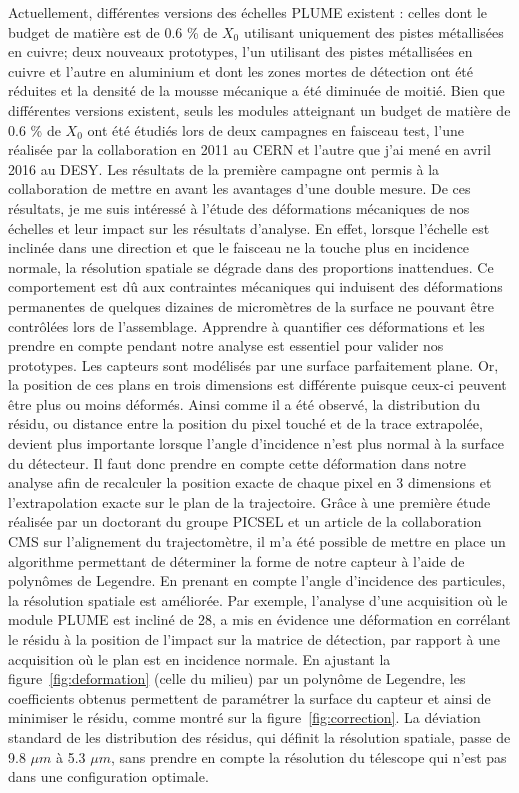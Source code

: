 \documentclass[a4papper, 10pt]{article}
\begin{document}
  Actuellement, différentes versions des échelles PLUME existent : celles dont le budget de matière est de 0.6 \% de $X_0$ utilisant uniquement des pistes métallisées en cuivre; deux nouveaux prototypes, l'un utilisant des pistes métallisées en cuivre et l'autre en aluminium et dont les zones mortes de détection ont été réduites et la densité de la mousse mécanique a été diminuée de moitié.
  Bien que différentes versions existent, seuls les modules atteignant un budget de matière de 0.6 \% de $X_0$ ont été étudiés lors de deux campagnes en faisceau test, l'une réalisée par la collaboration en 2011 au CERN et l'autre que j'ai mené en avril 2016 au DESY.
  Les résultats de la première campagne ont permis à la collaboration de mettre en avant les avantages d'une double mesure. 
  De ces résultats, je me suis intéressé à l'étude des déformations mécaniques de nos échelles et leur impact sur les résultats d'analyse.
  En effet, lorsque l'échelle est inclinée dans une direction et que le faisceau ne la touche plus en incidence normale, la résolution spatiale se dégrade dans des proportions inattendues.
  Ce comportement est dû aux contraintes mécaniques qui induisent des déformations permanentes de quelques dizaines de micromètres de la surface ne pouvant être contrôlées lors de l'assemblage.
  Apprendre à quantifier ces déformations et les prendre en compte pendant notre analyse est essentiel pour valider nos prototypes.
  Les capteurs sont modélisés par une surface parfaitement plane.
  Or, la position de ces plans en trois dimensions est différente puisque ceux-ci peuvent être plus ou moins déformés.
  Ainsi comme il a été observé, la distribution du résidu, ou distance entre la position du pixel touché et de la trace extrapolée, devient plus importante lorsque l'angle d'incidence n'est plus normal à la surface du détecteur.
  Il faut donc prendre en compte cette déformation dans notre analyse afin de recalculer la position exacte de chaque pixel en 3 dimensions et l'extrapolation exacte sur le plan de la trajectoire. 
  Grâce à une première étude réalisée par un doctorant du groupe PICSEL et un article de la collaboration CMS sur l'alignement du trajectomètre\cite{Chatrchyan:2009sr}, il m'a été possible de mettre en place un algorithme permettant de déterminer la forme de notre capteur à l'aide de polynômes de Legendre. 
  En prenant en compte l'angle d'incidence des particules, la résolution spatiale est améliorée. 
  Par exemple, l'analyse d'une acquisition où le module PLUME est incliné de 28\degre, a mis en évidence une déformation en corrélant le résidu à la position de l'impact sur la matrice de détection, par rapport à une acquisition où le plan est en incidence normale.
  En ajustant la figure~\ref{fig:deformation} (celle du milieu) par un polynôme de Legendre, les coefficients obtenus permettent de paramétrer la surface du capteur et ainsi de minimiser le résidu, comme montré sur la figure~\ref{fig:correction}. 
  La déviation standard de les distribution des résidus, qui définit la résolution spatiale, passe de 9.8 $\mu m$ à 5.3 $\mu m$, sans prendre en compte la résolution du télescope qui n'est pas dans une configuration optimale.
\end{document}
